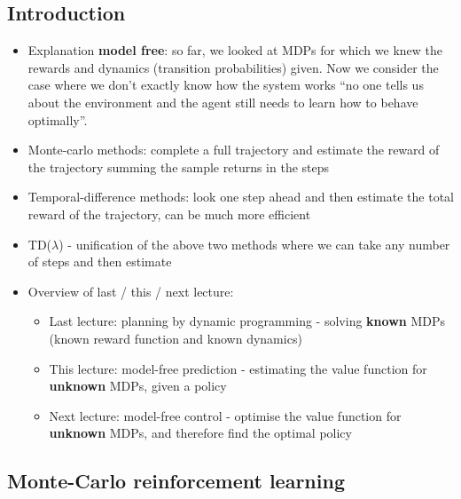 \documentclass{article}
\begin{document}
\subsection{Introduction}

\begin{itemize}
    \item Explanation \textbf{model free}: so far, we looked at MDPs for which we knew the rewards and dynamics (transition probabilities) given. Now we consider the case where we don't exactly know how the system works ``no one tells us about the environment and the agent still needs to learn how to behave optimally''.
    \item Monte-carlo methods: complete a full trajectory and estimate the reward of the trajectory summing the sample returns in the steps
    \item Temporal-difference methods: look one step ahead and then estimate the total reward of the trajectory, can be much more efficient
    \item TD($\lambda$) - unification of the above two methods where we can take any number of steps and then estimate
    \item Overview of last / this / next lecture:
    \begin{itemize}
        \item Last lecture: planning by dynamic programming - solving \textbf{known} MDPs (known reward function and known dynamics)
        \item This lecture: model-free prediction - estimating the value function for \textbf{unknown} MDPs, given a policy
        \item Next lecture: model-free control - optimise the value function for \textbf{unknown} MDPs, and therefore find the optimal policy
    \end{itemize}
\end{itemize}

\subsection{Monte-Carlo reinforcement learning}
\end{document}
